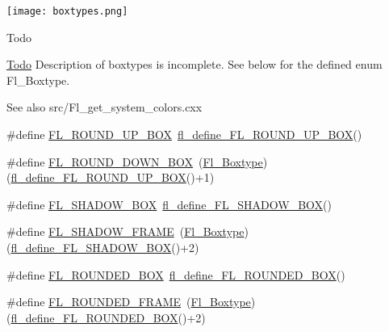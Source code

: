 \begin{DoxyImage}
\texttt{[image: boxtypes.png]}
\end{DoxyImage}
 \begin{DoxyRefDesc}{Todo}
\item[\hyperlink{todo__todo000003}{Todo}]Description of boxtypes is incomplete. See below for the defined enum Fl\+\_\+\+Boxtype. \end{DoxyRefDesc}
\begin{DoxySeeAlso}{See also}
src/\+Fl\+\_\+get\+\_\+system\+\_\+colors.\+cxx 
\end{DoxySeeAlso}
\begin{DoxyCompactItemize}
\item 
\#define \hyperlink{_enumerations_8_h_a7d2ffbfc7801c6f04562fc18e53b9cd4}{F\+L\+\_\+\+R\+O\+U\+N\+D\+\_\+\+U\+P\+\_\+\+B\+OX}~\hyperlink{_enumerations_8_h_a10a70f87f0e34937ae479b07fa9cfbf0}{fl\+\_\+define\+\_\+\+F\+L\+\_\+\+R\+O\+U\+N\+D\+\_\+\+U\+P\+\_\+\+B\+OX}()
\item 
\#define \hyperlink{_enumerations_8_h_a792a19a6999cf43f93a7895e891d40a9}{F\+L\+\_\+\+R\+O\+U\+N\+D\+\_\+\+D\+O\+W\+N\+\_\+\+B\+OX}~(\hyperlink{_enumerations_8_h_ae48bf9070f8541de17829f54ccacc6bc}{Fl\+\_\+\+Boxtype})(\hyperlink{_enumerations_8_h_a10a70f87f0e34937ae479b07fa9cfbf0}{fl\+\_\+define\+\_\+\+F\+L\+\_\+\+R\+O\+U\+N\+D\+\_\+\+U\+P\+\_\+\+B\+OX}()+1)
\item 
\#define \hyperlink{_enumerations_8_h_a04c0c06aa87ee590f047f51b1980684c}{F\+L\+\_\+\+S\+H\+A\+D\+O\+W\+\_\+\+B\+OX}~\hyperlink{_enumerations_8_h_a4bb54e3e06e377e803dc913d4d61630a}{fl\+\_\+define\+\_\+\+F\+L\+\_\+\+S\+H\+A\+D\+O\+W\+\_\+\+B\+OX}()
\item 
\#define \hyperlink{_enumerations_8_h_acdb464805f3c45206da72d1b33796c91}{F\+L\+\_\+\+S\+H\+A\+D\+O\+W\+\_\+\+F\+R\+A\+ME}~(\hyperlink{_enumerations_8_h_ae48bf9070f8541de17829f54ccacc6bc}{Fl\+\_\+\+Boxtype})(\hyperlink{_enumerations_8_h_a4bb54e3e06e377e803dc913d4d61630a}{fl\+\_\+define\+\_\+\+F\+L\+\_\+\+S\+H\+A\+D\+O\+W\+\_\+\+B\+OX}()+2)
\item 
\#define \hyperlink{_enumerations_8_h_a3e3a24199c0758ee1d9f25ca2338d692}{F\+L\+\_\+\+R\+O\+U\+N\+D\+E\+D\+\_\+\+B\+OX}~\hyperlink{_enumerations_8_h_a5830cccb7640d9fb61c1067200b4b9d2}{fl\+\_\+define\+\_\+\+F\+L\+\_\+\+R\+O\+U\+N\+D\+E\+D\+\_\+\+B\+OX}()
\item 
\#define \hyperlink{_enumerations_8_h_a26c5f8f256d97c5c9021632cd5d60e15}{F\+L\+\_\+\+R\+O\+U\+N\+D\+E\+D\+\_\+\+F\+R\+A\+ME}~(\hyperlink{_enumerations_8_h_ae48bf9070f8541de17829f54ccacc6bc}{Fl\+\_\+\+Boxtype})(\hyperlink{_enumerations_8_h_a5830cccb7640d9fb61c1067200b4b9d2}{fl\+\_\+define\+\_\+\+F\+L\+\_\+\+R\+O\+U\+N\+D\+E\+D\+\_\+\+B\+OX}()+2)

\end{DoxyCompactItemize}
